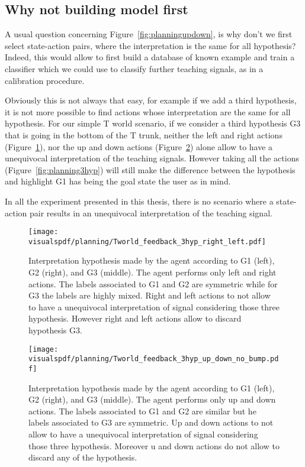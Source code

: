 \subsection{Why not building model first}

A usual question concerning Figure~\ref{fig:planningupdown}, is why don't we first select state-action pairs, where the interpretation is the same for all hypothesis? Indeed, this would allow to first build a database of known example and train a classifier which we could use to classify further teaching signals, as in a calibration procedure.

Obviously this is not always that easy, for example if we add a third hypothesis, it is not more possible to find actions whose interpretation are the same for all hypothesis. For our simple T world scenario, if we consider a third hypothesis G3 that is going in the bottom of the T trunk, neither the left and right actions (Figure~\ref{fig:planning3hyprightleft}), nor the up and down actions (Figure~\ref{fig:planning3hypupdown}) alone allow to have a unequivocal interpretation of the teaching signals. However taking all the actions (Figure~\ref{fig:planning3hyp}) will still make the difference between the hypothesis and highlight G1 has being the goal state the user as in mind.

In all the experiment presented in this thesis, there is no scenario where a state-action pair results in an unequivocal interpretation of the teaching signal. 

\begin{figure}[!ht]
  \centering
  \texttt{[image: \\visualspdf/planning/Tworld\_feedback\_3hyp\_right\_left.pdf]}
  \caption{Interpretation hypothesis made by the agent according to G1 (left), G2 (right), and G3 (middle). The agent performs only left and right actions. The labels associated to G1 and G2 are symmetric while for G3 the labels are highly mixed. Right and left actions to not allow to have a unequivocal interpretation of signal considering those three hypothesis. However right and left actions allow to discard hypothesis G3.}
  \label{fig:planning3hyprightleft}
\end{figure}

\begin{figure}[!ht]
  \centering
  \texttt{[image: \\visualspdf/planning/Tworld\_feedback\_3hyp\_up\_down\_no\_bump.pdf]}
  \caption{Interpretation hypothesis made by the agent according to G1 (left), G2 (right), and G3 (middle). The agent performs only up and down actions. The labels associated to G1 and G2 are similar but he labels associated to G3 are symmetric. Up and down actions to not allow to have a unequivocal interpretation of signal considering those three hypothesis. Moreover u and down actions do not allow to discard any of the hypothesis.}
  \label{fig:planning3hypupdown}
\end{figure}


